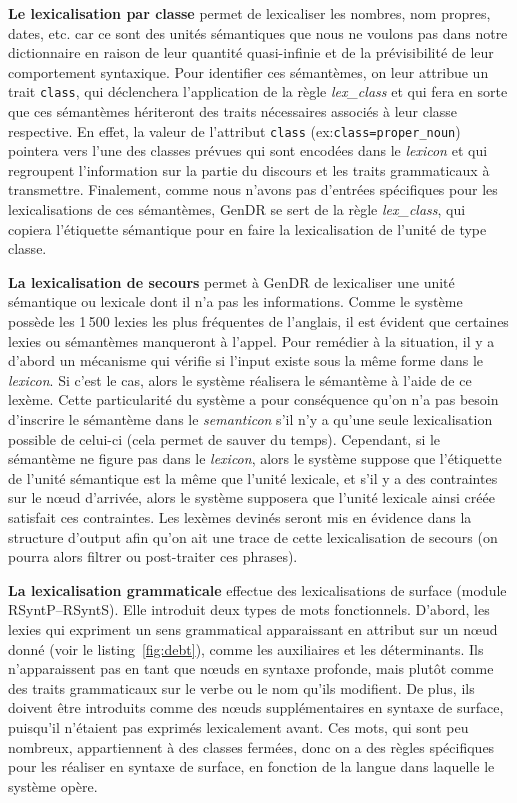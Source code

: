 \textbf{Le lexicalisation par classe} permet de lexicaliser les nombres, nom propres, dates, etc. car ce sont des unités sémantiques que nous ne voulons pas dans notre dictionnaire en raison de leur quantité quasi-infinie et de la prévisibilité de leur comportement syntaxique. Pour identifier ces sémantèmes, on leur attribue un trait \texttt{class}, qui déclenchera l'application de la règle \emph{lex\_class} et qui fera en sorte que ces sémantèmes hériteront des traits nécessaires associés à leur classe respective. En effet, la valeur de l'attribut \texttt{class} (ex:\texttt{class=proper\_noun}) pointera vers l'une des classes prévues qui sont encodées dans le \emph{lexicon} et qui regroupent l'information sur la partie du discours et les traits grammaticaux à transmettre. Finalement, comme nous n'avons pas d'entrées spécifiques pour les lexicalisations de ces sémantèmes, GenDR se sert de la règle \emph{lex\_class}, qui copiera l'étiquette sémantique pour en faire la lexicalisation de l'unité de type classe.

\textbf{La lexicalisation de secours} 
permet à GenDR de lexicaliser une unité sémantique ou lexicale dont il n'a pas les informations. Comme le système possède les 1\,500 lexies les plus fréquentes de l'anglais, il est évident que certaines lexies ou sémantèmes manqueront à l'appel. Pour remédier à la situation, il y a d'abord un mécanisme qui vérifie si l'input existe sous la même forme dans le \emph{lexicon}. Si c'est le cas, alors le système réalisera le sémantème à l'aide de ce lexème. Cette particularité du système a pour conséquence qu'on n'a pas besoin d'inscrire le sémantème dans le \emph{semanticon} s'il n'y a qu'une seule lexicalisation possible de celui-ci (cela permet de sauver du temps). Cependant, si le sémantème ne figure pas dans le \emph{lexicon}, alors le système suppose que l'étiquette de l'unité sémantique est la même que l'unité lexicale, et s'il y a des contraintes sur le n\oe{}ud d'arrivée, alors le système supposera que l'unité lexicale ainsi créée satisfait ces contraintes. Les lexèmes devinés seront mis en évidence dans la structure d'output afin qu'on ait une trace de cette lexicalisation de secours (on pourra alors filtrer ou post-traiter ces phrases).

\textbf{La lexicalisation grammaticale}
effectue des lexicalisations de surface (module \ac{RSyntP}--\ac{RSyntS}). Elle introduit deux types de mots fonctionnels. D'abord, les lexies qui expriment un sens grammatical apparaissant en attribut sur un n\oe{}ud donné (voir le listing~\ref{fig:debt}), comme les auxiliaires et les déterminants. Ils n'apparaissent pas en tant que n\oe{}uds en syntaxe profonde, mais plutôt comme des traits grammaticaux sur le verbe ou le nom qu'ils modifient. De plus, ils doivent être introduits comme des n\oe{}uds supplémentaires en syntaxe de surface, puisqu'il n'étaient pas exprimés lexicalement avant. Ces mots, qui sont peu nombreux, appartiennent à des classes fermées, donc on a des règles spécifiques pour les réaliser en syntaxe de surface, en fonction de la langue dans laquelle le système opère.

